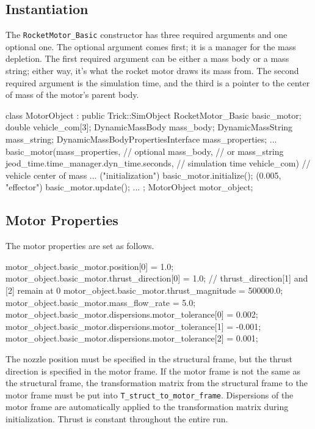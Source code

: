 \documentclass[11pt,fleqn]{report}
\begin{document}
\subsection{Instantiation}
\par The \verb|RocketMotor_Basic| constructor has three required arguments and one optional one. The optional argument comes first; it is a manager for the mass depletion. The first required argument can be either a mass body or a mass string; either way, it's what the rocket motor draws its mass from. The second required argument is the simulation time, and the third is a pointer to the center of mass of the motor's parent body.
\begin{code}
class MotorObject : public Trick::SimObject {
  RocketMotor_Basic      basic_motor;
  double                 vehicle_com[3];
  DynamicMassBody        mass_body;
  DynamicMassString      mass_string;
  DynamicMassBodyPropertiesInterface mass_properties;
...
  basic_motor(mass_properties, // optional
              mass_body,       // or mass_string
              jeod_time.time_manager.dyn_time.seconds, 
                              // simulation time
              vehicle_com)    // vehicle center of mass
...
    ("initialization")   basic_motor.initialize();
    (0.005, "effector")  basic_motor.update();
...
};
MotorObject motor_object;
\end{code}

\subsection{Motor Properties}
\par The motor properties are set as follows.
\begin{code}
motor_object.basic_motor.position[0] = 1.0;
motor_object.basic_motor.thrust_direction[0] = 1.0;
// thrust_direction[1] and [2] remain at 0
motor_object.basic_motor.thrust_magnitude = 500000.0;
motor_object.basic_motor.mass_flow_rate = 5.0;
motor_object.basic_motor.dispersions.motor_tolerance[0] =  0.002;
motor_object.basic_motor.dispersions.motor_tolerance[1] = -0.001;
motor_object.basic_motor.dispersions.motor_tolerance[2] =  0.001;
\end{code}
The nozzle position must be specified in the structural frame, but the thrust direction is specified in the motor frame. If the motor frame is not the same as the structural frame, the transformation matrix from the structural frame to the motor frame must be put into \verb|T_struct_to_motor_frame|. Dispersions of the motor frame are automatically applied to the transformation matrix during initialization.  Thrust is constant throughout the entire run.
\end{document}
